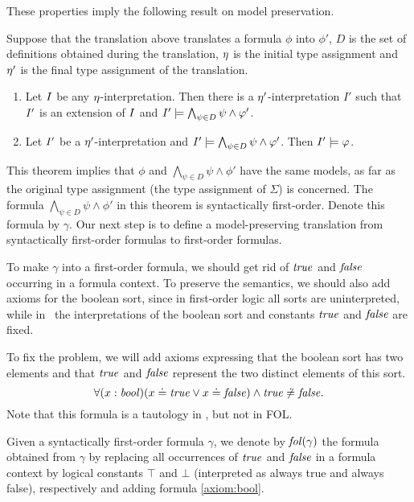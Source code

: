 These properties imply the following result on model preservation.

\begin{theorem}\label{thm:model:preservation}\rm
  Suppose that the translation above translates a formula $\phi$ into $\phi'$, $D$ is the set of definitions obtained during the translation, $\eta$ is the initial type assignment and $\eta'$ is the final type assignment of the translation. 
  \begin{enumerate}
    \item Let $I$ be any $\eta$-interpretation. Then there is a $\eta'$-interpretation $I'$ such that $I'$ is an extension of $I$ and $I' \models \bigwedge_{\psi \in D} \psi \wedge \varphi'$.
    \item Let $I'$ be a $\eta'$-interpretation and $I' \models \bigwedge_{\psi \in D} \psi \wedge \varphi'$. Then $I' \models \varphi$. \QED
  \end{enumerate}
\end{theorem}
This theorem implies that $\phi$ and $\bigwedge_{\psi \in D} \psi \wedge \phi'$ have the same models, as far as the original type assignment (the type assignment of $\Sigma$) is concerned. The formula $\bigwedge_{\psi \in D} \psi \wedge \phi'$ in this theorem is syntactically first-order. Denote this formula by $\gamma$. Our next step is to define a model-preserving translation from syntactically first-order formulas to first-order formulas.

To make $\gamma$ into a first-order formula, we should get rid of $\mathit{true}$ and $\mathit{false}$ occurring in a formula context. To preserve the semantics, we should also add axioms for the boolean sort, since in first-order logic all sorts are uninterpreted, while in \folb\ the interpretations of the boolean sort and constants $\mathit{true}$ and $\mathit{false}$ are fixed. 

To fix the problem, we will add axioms expressing that the boolean sort has two elements and that $\mathit{true}$ and $\mathit{false}$ represent the two distinct elements of this sort.
\begin{equation}\label{axiom:bool}
  \forall (x:\mathit{bool})(x \doteq \mathit{true} \vee x \doteq \mathit{false}) \wedge \mathit{true} \not\doteq \mathit{false}.
\end{equation}
Note that this formula is a tautology in \folb, but not in FOL.

Given a syntactically first-order formula $\gamma$, we denote by $\mathit{fol}(\gamma)$ the formula obtained from $\gamma$ by replacing all occurrences of $\mathit{true}$ and $\mathit{false}$ in a formula context by logical constants $\top$ and $\bot$ (interpreted as always true and always false), respectively and adding formula \eqref{axiom:bool}.

